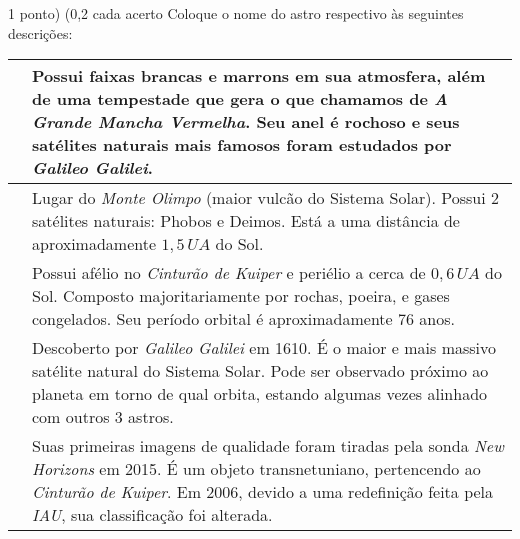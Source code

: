 \documentclass{../lista}
\begin{document}
	\begin{questao}{1 ponto) (0,2 cada acerto}
		Coloque o nome do astro respectivo às seguintes descrições:

		\begin{center} \begin{tabular}{|M{0.2\textwidth}|M{0.65\textwidth}|}
			\hline
			 & Possui faixas brancas e marrons em sua atmosfera, além de uma tempestade que gera o que chamamos de \textit{A Grande Mancha Vermelha}. Seu anel é rochoso e seus satélites naturais mais famosos foram estudados por \textit{Galileo Galilei}. \\ \hline
			 & Lugar do \textit{Monte Olimpo} (maior vulcão do Sistema Solar). Possui 2 satélites naturais: Phobos e Deimos. Está a uma distância de aproximadamente $1,5 \, UA$ do Sol. \\ \hline
			 & Possui afélio no \textit{Cinturão de Kuiper} e periélio a cerca de $0,6 \, UA$ do Sol. Composto majoritariamente por rochas, poeira, e gases congelados. Seu período orbital é aproximadamente $76$ anos. \\ \hline
			 & Descoberto por \textit{Galileo Galilei} em 1610. É o maior e mais massivo satélite natural do Sistema Solar. Pode ser observado próximo ao planeta em torno de qual orbita, estando algumas vezes alinhado com outros 3 astros.  \\ \hline
			 & Suas primeiras imagens de qualidade foram tiradas pela sonda \textit{New Horizons} em 2015. É um objeto transnetuniano, pertencendo ao \textit{Cinturão de Kuiper}. Em 2006, devido a uma redefinição feita pela \textit{IAU}, sua classificação foi alterada. \\ \hline
		\end{tabular} \end{center}
	\end{questao}
\end{document}
